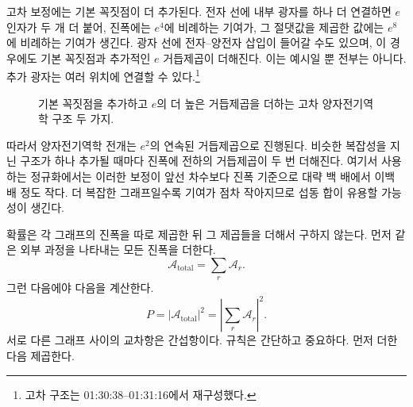 고차 보정에는 기본 꼭짓점이 더 추가된다. 전자 선에 내부 광자를 하나 더 연결하면 \(e\) 인자가 두 개 더 붙어, 진폭에는 \(e^4\)에 비례하는 기여가, 그 절댓값을 제곱한 값에는 \(e^8\)에 비례하는 기여가 생긴다. 광자 선에 전자--양전자 삽입이 들어갈 수도 있으며, 이 경우에도 기본 꼭짓점과 추가적인 \(e\) 거듭제곱이 더해진다. 이는 예시일 뿐 전부는 아니다. 추가 광자는 여러 위치에 연결할 수 있다.\footnote{고차 구조는 01:30:38--01:31:16에서 재구성했다.}

\begin{figure}[htbp]
\centering
{}
\caption{기본 꼭짓점을 추가하고 \(e\)의 더 높은 거듭제곱을 더하는 고차 양자전기역학 구조 두 가지.}
\end{figure}

따라서 양자전기역학 전개는 \(e^2\)의 연속된 거듭제곱으로 진행된다. 비슷한 복잡성을 지닌 구조가 하나 추가될 때마다 진폭에 전하의 거듭제곱이 두 번 더해진다. 여기서 사용하는 정규화에서는 이러한 보정이 앞선 차수보다 진폭 기준으로 대략 백 배에서 이백 배 정도 작다. 더 복잡한 그래프일수록 기여가 점차 작아지므로 섭동 합이 유용할 가능성이 생긴다.

확률은 각 그래프의 진폭을 따로 제곱한 뒤 그 제곱들을 더해서 구하지 않는다. 먼저 같은 외부 과정을 나타내는 모든 진폭을 더한다.
\begin{equation}
\mathcal{A}_{\mathrm{total}}=\sum_r\mathcal{A}_r.
\end{equation}
그런 다음에야 다음을 계산한다.
\begin{equation}
P=\left|\mathcal{A}_{\mathrm{total}}\right|^2
=\left|\sum_r\mathcal{A}_r\right|^2.
\end{equation}
서로 다른 그래프 사이의 교차항은 간섭항이다. 규칙은 간단하고 중요하다. 먼저 더한 다음 제곱한다.

